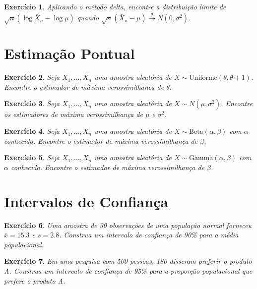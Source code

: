\documentclass[12pt,a4paper]{article}
\newtheorem{exercise}{Exercício}
\begin{document}
\begin{exercise}
Aplicando o método delta, encontre a distribuição limite de $\sqrt{n}(\log \bar{X}_n - \log \mu)$ quando $\sqrt{n}(\bar{X}_n - \mu) \xrightarrow{d} N(0, \sigma^2)$.
\end{exercise}

\section{Estimação Pontual}

\begin{exercise}
Seja $X_1, \ldots, X_n$ uma amostra aleatória de $X \sim \text{Uniforme}(\theta, \theta+1)$. Encontre o estimador de máxima verossimilhança de $\theta$.
\end{exercise}

\begin{exercise}
Seja $X_1, \ldots, X_n$ uma amostra aleatória de $X \sim N(\mu, \sigma^2)$. Encontre os estimadores de máxima verossimilhança de $\mu$ e $\sigma^2$.
\end{exercise}

\begin{exercise}
Seja $X_1, \ldots, X_n$ uma amostra aleatória de $X \sim \text{Beta}(\alpha, \beta)$ com $\alpha$ conhecido. Encontre o estimador de máxima verossimilhança de $\beta$.
\end{exercise}

\begin{exercise}
Seja $X_1, \ldots, X_n$ uma amostra aleatória de $X \sim \text{Gamma}(\alpha, \beta)$ com $\alpha$ conhecido. Encontre o estimador de máxima verossimilhança de $\beta$.
\end{exercise}

\section{Intervalos de Confiança}

\begin{exercise}
Uma amostra de 30 observações de uma população normal forneceu $\bar{x} = 15.3$ e $s = 2.8$. Construa um intervalo de confiança de 90\% para a média populacional.
\end{exercise}

\begin{exercise}
Em uma pesquisa com 500 pessoas, 180 disseram preferir o produto A. Construa um intervalo de confiança de 95\% para a proporção populacional que prefere o produto A.
\end{exercise}
\end{document}
